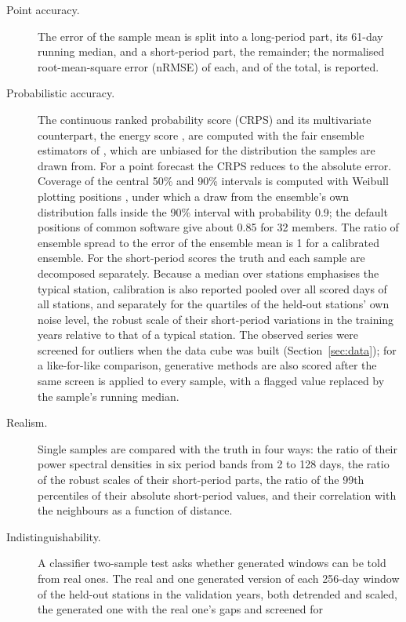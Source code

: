 \documentclass[preprint,12pt,authoryear]{elsarticle}
\begin{document}
\begin{description}
  \item[Point accuracy.] The error of the sample mean is split into a long-period part,
    its 61-day running median, and a short-period part, the remainder; the normalised
    root-mean-square error (nRMSE) of each, and of the total, is reported.
  \item[Probabilistic accuracy.] The continuous ranked probability score (CRPS) and its
    multivariate counterpart, the energy score \citep{gneiting2007}, are computed with
    the fair ensemble estimators of \citet{ferro2014}, which are unbiased for the
    distribution the samples are drawn from. For a point forecast the CRPS reduces to the
    absolute error. Coverage of the central 50\% and 90\% intervals is computed with
    Weibull plotting positions \citep{hyndman1996}, under which a draw from the
    ensemble's own distribution falls inside the 90\% interval with probability 0.9; the
    default positions of common software give about 0.85 for 32 members. The ratio of
    ensemble spread to the error of the ensemble mean is 1 for a calibrated ensemble. For
    the short-period scores the truth and each sample are decomposed separately. Because
    a median over stations emphasises the typical station, calibration is also reported
    pooled over all scored days of all stations, and separately for the quartiles of the
    held-out stations' own noise level, the robust scale of their short-period variations
    in the training years relative to that of a typical station. The observed series were
    screened for outliers when the data cube was built (Section~\ref{sec:data}); for a
    like-for-like comparison, generative methods are also scored after the same screen is
    applied to every sample, with a flagged value replaced by the sample's running median.
  \item[Realism.] Single samples are compared with the truth in four ways: the ratio of
    their power spectral densities in six period bands from 2 to 128 days, the ratio of
    the robust scales of their short-period parts, the ratio of the 99th percentiles of
    their absolute short-period values, and their correlation with the neighbours as a
    function of distance.
  \item[Indistinguishability.] A classifier two-sample test \citep{lopezpaz2017} asks
    whether generated windows can be told from real ones. The real and one generated
    version of each 256-day window of the held-out stations in the validation years, both
    detrended and scaled, the generated one with the real one's gaps and screened for

\end{description}
\end{document}
